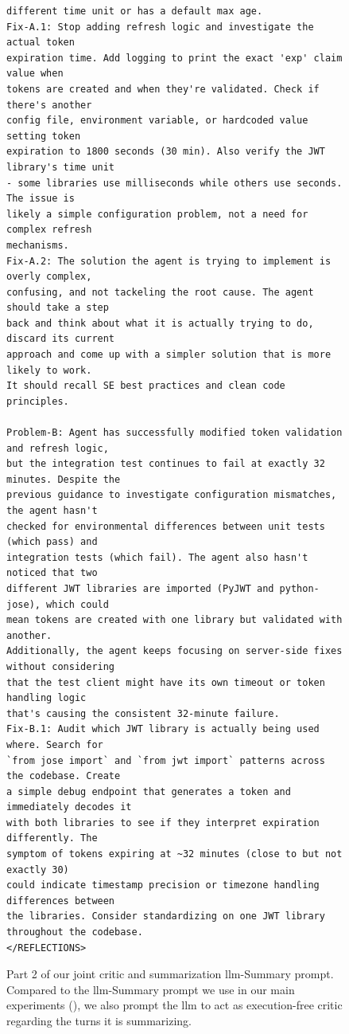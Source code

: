 \documentclass{article}
\begin{document}
\begin{figure}[th]
\begin{tcolorbox}[
  colback=jb_magenta_accent,
  colframe=jb_magenta,
  title=Joint Critic-Summary Prompt (Part 2), width=\textwidth
]
\begin{small}
\begin{verbatim}
different time unit or has a default max age.
Fix-A.1: Stop adding refresh logic and investigate the actual token 
expiration time. Add logging to print the exact 'exp' claim value when 
tokens are created and when they're validated. Check if there's another
config file, environment variable, or hardcoded value setting token 
expiration to 1800 seconds (30 min). Also verify the JWT library's time unit 
- some libraries use milliseconds while others use seconds. The issue is 
likely a simple configuration problem, not a need for complex refresh 
mechanisms.
Fix-A.2: The solution the agent is trying to implement is overly complex, 
confusing, and not tackeling the root cause. The agent should take a step 
back and think about what it is actually trying to do, discard its current
approach and come up with a simpler solution that is more likely to work. 
It should recall SE best practices and clean code principles.

Problem-B: Agent has successfully modified token validation and refresh logic, 
but the integration test continues to fail at exactly 32 minutes. Despite the
previous guidance to investigate configuration mismatches, the agent hasn't 
checked for environmental differences between unit tests (which pass) and 
integration tests (which fail). The agent also hasn't noticed that two
different JWT libraries are imported (PyJWT and python-jose), which could
mean tokens are created with one library but validated with another. 
Additionally, the agent keeps focusing on server-side fixes without considering
that the test client might have its own timeout or token handling logic 
that's causing the consistent 32-minute failure.
Fix-B.1: Audit which JWT library is actually being used where. Search for 
`from jose import` and `from jwt import` patterns across the codebase. Create
a simple debug endpoint that generates a token and immediately decodes it 
with both libraries to see if they interpret expiration differently. The 
symptom of tokens expiring at ~32 minutes (close to but not exactly 30) 
could indicate timestamp precision or timezone handling differences between 
the libraries. Consider standardizing on one JWT library throughout the codebase.
</REFLECTIONS>
\end{verbatim}
\end{small}
\end{tcolorbox}
\caption{Part 2 of our joint critic and summarization \ac{llm}-Summary prompt. Compared to the \ac{llm}-Summary prompt we use in our main experiments (), we also prompt the \ac{llm} to act as execution-free critic regarding the turns it is summarizing.}
\label{fig:prompt:llm-critic-2}
\end{figure}
\end{document}
